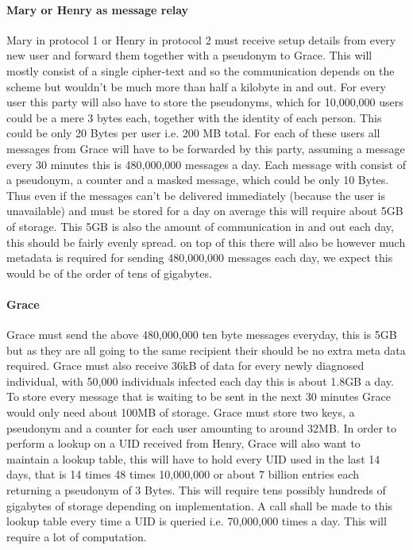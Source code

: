 \documentclass{article}
\begin{document}
\paragraph{Mary or Henry as message relay}
Mary in protocol 1 or Henry in protocol 2 must receive setup details from every new user and forward them together with a pseudonym to Grace. This will mostly consist of a single cipher-text and so the communication depends on the scheme but wouldn't be much more than half a kilobyte in and out. For every user this party will also have to store the pseudonyms, which for 10,000,000 users could be a mere 3 bytes each, together with the identity of each person. This could be only 20 Bytes per user i.e. 200 MB total. For each of these users all messages from Grace will have to be forwarded by this party, assuming a message every 30 minutes this is 480,000,000 messages a day. Each message with consist of a pseudonym, a counter and a masked message, which could be only 10 Bytes. Thus even if the messages can't be delivered immediately (because the user is unavailable) and must be stored for a day on average this will require about 5GB of storage. This 5GB is also the amount of communication in and out each day, this should be fairly evenly spread. on top of this there will also be however much metadata is required for sending 480,000,000 messages each day, we expect this would be of the order of tens of gigabytes.

\paragraph{Grace}
Grace must send the above 480,000,000 ten byte messages everyday, this is 5GB but as they are all going to the same recipient their should be no extra meta data required. Grace must also receive 36kB of data for every newly diagnosed individual, with 50,000 individuals infected each day this is about 1.8GB a day. To store every message that is waiting to be sent in the next 30 minutes Grace would only need about 100MB of storage. Grace must store two keys, a pseudonym and a counter for each user amounting to around 32MB. In order to perform a lookup on a UID received from Henry, Grace will also want to maintain a lookup table, this will have to hold every UID used in the last 14 days, that is 14 times 48 times 10,000,000 or about 7 billion entries each returning a pseudonym of 3 Bytes. This will require tens possibly hundreds of gigabytes of storage depending on implementation. A call shall be made to this lookup table every time a UID is queried i.e. 70,000,000 times a day. This will require a lot of computation.
\end{document}

